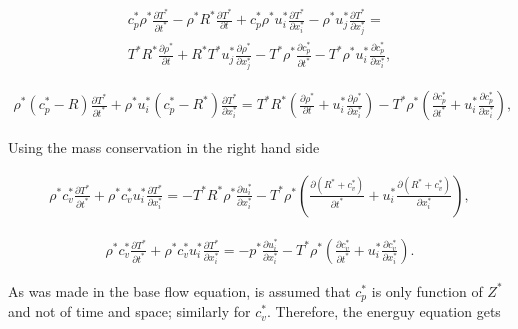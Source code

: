 \begin{equation*}
\begin{split}
c_p^*
\rho^*
\frac{\partial  T^*}{\partial  t^*}
-
\rho^*
R^*
\frac{\partial  T^*}{\partial t} 
+
c_p^*
\rho^*
u_i^*
\frac{\partial T^*}{\partial  x_i^*}
-
\rho^*
u_j^*
\frac{\partial  T^*}{\partial x_j^*} 
= 
\\
T^*
R^*
\frac{\partial \rho^*}{\partial t} 
+
R^*
T^*
u_j^*
\frac{\partial \rho^* }{\partial x_j^*} 
-
T^*
\rho^*
\frac{\partial  c_p^*}{\partial  t^*}
-
T^*
\rho^*
u_i^*
\frac{\partial c_p^*}{\partial  x_i^*}
,
\end{split}
\end{equation*} 

\begin{equation*}
\begin{split}
\rho^*
\left(
c_p^*
-
R
\right)
\frac{\partial  T^*}{\partial  t^*}
+
\rho^*
u_i^*
\left(
    c_p^*
    -
    R^* 
\right)
\frac{\partial  T^*}{\partial x_i^*} 
= 
T^*
R^*
\left(
\frac{\partial \rho^*}{\partial t} 
+
u_i^*
\frac{\partial \rho^* }{\partial x_i^*} 
\right)
-
T^*
\rho^*
\left(
\frac{\partial  c_p^*}{\partial  t^*}
+
u_i^*
\frac{\partial c_p^*}{\partial  x_i^*}
\right)
,
\end{split}
\end{equation*} 

Using the mass conservation in the right hand side 

\begin{equation*}
\begin{split}
\rho^*
c_v^*
\frac{\partial  T^*}{\partial  t^*}
+
\rho^*
c_v^*
u_i^*
\frac{\partial  T^*}{\partial x_i^*} 
= 
-
T^*
R^*
\rho^*
\frac{\partial u_i^* }{\partial x_i^*} 
-
T^*
\rho^*
\left(
\frac{\partial  (R^*+c_v^*)}{\partial  t^*}
+
u_i^*
\frac{\partial (R^*+c_v^*)}{\partial  x_i^*}
\right)
,
\end{split}
\end{equation*} 

\begin{equation*}
\begin{split}
\rho^*
c_v^*
\frac{\partial  T^*}{\partial  t^*}
+
\rho^*
c_v^*
u_i^*
\frac{\partial  T^*}{\partial x_i^*} 
= 
-
p^*
\frac{\partial u_i^* }{\partial x_i^*} 
-
T^*
\rho^*
\left(
\frac{\partial  c_v^*}{\partial  t^*}
+
u_i^*
\frac{\partial c_v^*}{\partial  x_i^*}
\right)
.
\end{split}
\end{equation*} 

As was made in the base flow equation, 
is assumed that $c_p^*$ is only function of $Z^*$
and not of time and space; similarly for $c_v^*$. 
Therefore, the energuy equation gets 

